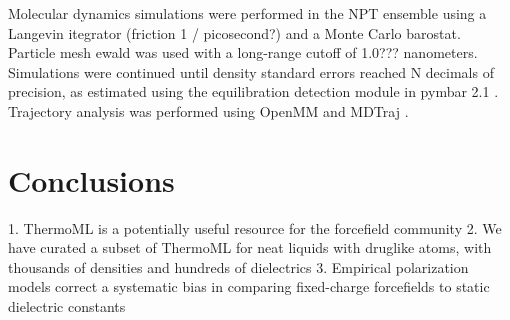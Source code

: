 \documentclass[aps,pre,twocolumn,superscriptaddress]{revtex4-1}
\begin{document}
Molecular dynamics simulations were performed in the NPT ensemble using a Langevin itegrator (friction 1 / picosecond?) and a Monte Carlo barostat.  Particle mesh ewald \cite{} was used with a long-range cutoff of 1.0??? nanometers.  Simulations were continued until density standard errors reached N decimals of precision, as estimated using the equilibration detection module in pymbar 2.1 \cite{}.  Trajectory analysis was performed using OpenMM \cite{} and MDTraj \cite{}.  

\section{Conclusions}

1.  ThermoML is a potentially useful resource for the forcefield community
2.  We have curated a subset of ThermoML for neat liquids with druglike atoms, with thousands of densities and hundreds of dielectrics
3.  Empirical polarization models correct a systematic bias in comparing fixed-charge forcefields to static dielectric constants



\end{document}
